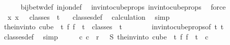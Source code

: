 \begin{isabellebody}
\ \ \ \ \isamarkupfalse%
\ bij{\isacharunderscore}{\kern0pt}betw{\isacharunderscore}{\kern0pt}def\ inj{\isacharunderscore}{\kern0pt}on{\isacharunderscore}{\kern0pt}def\ \isamarkupfalse%
\ inv{\isacharunderscore}{\kern0pt}into{\isacharunderscore}{\kern0pt}cube{\isacharunderscore}{\kern0pt}props{\isacharparenleft}{\kern0pt}{}{\isacharparenright}{\kern0pt}\ inv{\isacharunderscore}{\kern0pt}into{\isacharunderscore}{\kern0pt}cube{\isacharunderscore}{\kern0pt}props{\isacharparenleft}{\kern0pt}{}{\isacharparenright}{\kern0pt}\ \isamarkupfalse%
\ force\ \isanewline
\ \ \isamarkupfalse%
\ \isamarkupfalse%
\ {\isacharasterisk}{\kern0pt}{\isacharasterisk}{\kern0pt}{\isacharcolon}{\kern0pt}\ {\isachardoublequoteopen}{\isasymexists}{\isacharbang}{\kern0pt}x{\isachardot}{\kern0pt}\ x\ \ {\isasymin}\ classes\ {}\ t\ {}{\isachardoublequoteclose}\ \isamarkupfalse%
\ classes{\isacharunderscore}{\kern0pt}def\ \isamarkupfalse%
\ calculation{\isacharparenleft}{\kern0pt}{}{\isacharparenright}{\kern0pt}\ \isamarkupfalse%
\ simp\isanewline
\ \ \isamarkupfalse%
\ \isamarkupfalse%
\ {\isachardoublequoteopen}the{\isacharunderscore}{\kern0pt}inv{\isacharunderscore}{\kern0pt}into\ {\isacharparenleft}{\kern0pt}cube\ {}\ {\isacharparenleft}{\kern0pt}t{\isacharplus}{\kern0pt}{}{\isacharparenright}{\kern0pt}{\isacharparenright}{\kern0pt}\ {\isacharparenleft}{\kern0pt}{\isasymlambda}f{\isachardot}{\kern0pt}\ f\ {}{\isacharparenright}{\kern0pt}\ t\ {\isasymin}\ classes\ {}\ t\ {}{\isachardoublequoteclose}\ \isanewline
\ \ \ \ \isamarkupfalse%
\ inv{\isacharunderscore}{\kern0pt}into{\isacharunderscore}{\kern0pt}cube{\isacharunderscore}{\kern0pt}props{\isacharbrackleft}{\kern0pt}of\ t\ {\isachardoublequoteopen}t{\isacharplus}{\kern0pt}{}{\isachardoublequoteclose}{\isacharbrackright}{\kern0pt}\ \isamarkupfalse%
\ classes{\isacharunderscore}{\kern0pt}def\ \isamarkupfalse%
\ simp\isanewline
\isanewline
\ \ \isamarkupfalse%
\ \isamarkupfalse%
\ {\isachardoublequoteopen}{\isasymexists}c{}{\isachardot}{\kern0pt}\ c{}\ {\isacharless}{\kern0pt}\ r\ {\isasymand}\ {\isasymchi}\ {\isacharparenleft}{\kern0pt}S\ {\isacharparenleft}{\kern0pt}the{\isacharunderscore}{\kern0pt}inv{\isacharunderscore}{\kern0pt}into\ {\isacharparenleft}{\kern0pt}cube\ {}\ {\isacharparenleft}{\kern0pt}t{\isacharplus}{\kern0pt}{}{\isacharparenright}{\kern0pt}{\isacharparenright}{\kern0pt}\ {\isacharparenleft}{\kern0pt}{\isasymlambda}f{\isachardot}{\kern0pt}\ f\ {}{\isacharparenright}{\kern0pt}\ t{\isacharparenright}{\kern0pt}{\isacharparenright}{\kern0pt}\ {\isacharequal}{\kern0pt}\ c{}{\isachardoublequoteclose}\ \isanewline

\end{isabellebody}
